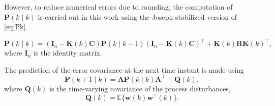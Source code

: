 However, to reduce numerical errors due to rounding, the computation of $\mathbf{P}(k \mid k)$ is carried out in this work using the Joseph stabilized version of \eqref{eq:Pk} {\citep{lewis_optimal_2008}
 \begin{equation} \label{eq:Pk-stab}
 	\mathbf{P}(k \mid k) = \left( \mathbf{I}_n - \mathbf{K}(k) \mathbf{C} \right ) \mathbf{P}(k \mid k-1) \left( \mathbf{I}_n - \mathbf{K}(k) \mathbf{C} \right )^\intercal + \mathbf{K}(k)  \mathbf{R} \mathbf{K}(k)^\intercal,
 \end{equation}
%
where $\mathbf{I}_n$ is the identity matrix.

The prediction of the error covariance at the next time instant is made using
%
\begin{equation} \label{eq:Pkp1}
	\mathbf{P}(k+1 \mid k) = \mathbf{A} \mathbf{P}(k \mid k)  \mathbf{A}^\intercal  + \mathbf{Q}(k),
\end{equation}
where $\mathbf{Q}(k)$ is the time-varying covariance of the process disturbances,
%
\begin{equation} \label{eq:Q}
	\mathbf{Q}(k) = \mathbb{E}\{ \mathbf{w}(k) \mathbf{w}^\intercal(k) \}.
\end{equation}

}
